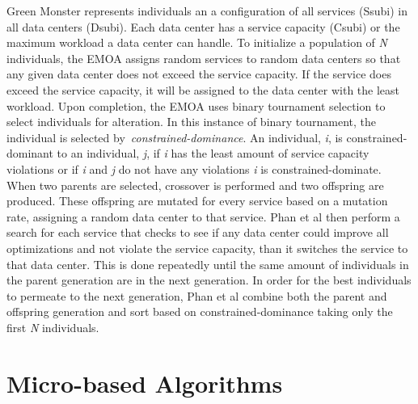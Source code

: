 \documentclass{sig-alternate}
\begin{document}
Green Monster represents individuals an a configuration of all services (Ssubi) in all data centers (Dsubi). Each data center has a service capacity (Csubi) or the maximum workload a data center can handle. To initialize a population of \emph{N} individuals, the EMOA assigns random services to random data centers so that any given data center does not exceed the service capacity. If the service does exceed the service capacity, it will be assigned to the data center with the least workload. Upon completion, the EMOA uses binary tournament selection to select individuals for alteration. In this instance of binary tournament, the individual is selected by~\emph{constrained-dominance}. An individual, \emph{i},  is constrained-dominant to an individual, \emph{j}, if \emph{i} has the least amount of service capacity violations or if \emph{i} and \emph{j} do not have any violations \emph{i} is constrained-dominate. When two parents are selected, crossover is performed and two offspring are produced. These offspring are mutated for every service based on a mutation rate, assigning a random data center to that service. Phan et al then perform a search for each service that checks to see if any data center could improve all optimizations and not violate the service capacity, than it switches the service to that data center. This is done repeatedly until the same amount of individuals in the parent generation are in the next generation. In order for the best individuals to permeate to the next generation, Phan et al combine both the parent and offspring generation and sort based on constrained-dominance taking only the first \emph{N} individuals. 


\section{Micro-based Algorithms} 
\label{sec:MicAl}




\end{document}
